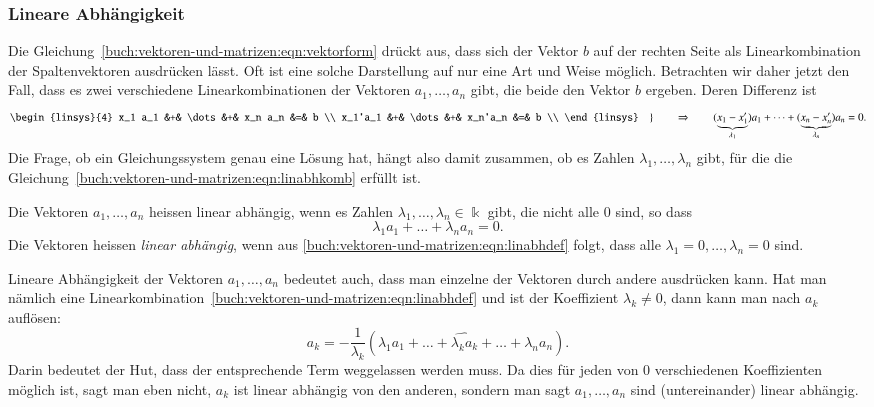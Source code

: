 \subsubsection{Lineare Abhängigkeit}
Die Gleichung~\eqref{buch:vektoren-und-matrizen:eqn:vektorform}
drückt aus, dass sich der Vektor $b$ auf der rechten Seite als
Linearkombination der Spaltenvektoren ausdrücken lässt.
Oft ist eine solche Darstellung auf nur eine Art und Weise möglich.
Betrachten wir daher jetzt den Fall, dass es zwei verschiedene
Linearkombinationen der Vektoren $a_1,\dots,a_n$ gibt, die beide den
Vektor $b$ ergeben.
Deren Differenz ist
\begin{equation}
\left.
\begin{linsys}{4}
x_1 a_1 &+& \dots &+& x_n a_n &=& b \\
x_1'a_1 &+& \dots &+& x_n'a_n &=& b \\
\end{linsys}
\quad\right\}
\qquad
\Rightarrow
\qquad
(\underbrace{x_1-x_1'}_{\lambda_1}) a_1
+
\dots
+
(\underbrace{x_n-x_n'}_{\lambda_n}) a_n
=
0.
\label{buch:vektoren-und-matrizen:eqn:linabhkomb}
\end{equation}
Die Frage, ob ein Gleichungssystem genau eine Lösung hat, hängt also
damit zusammen, ob es Zahlen $\lambda_1,\dots,\lambda_n$ gibt, für
die die Gleichung~\eqref{buch:vektoren-und-matrizen:eqn:linabhkomb}
erfüllt ist.

\begin{definition}
Die Vektoren $a_1,\dots,a_n$ heissen linear abhängig, wenn es Zahlen
$\lambda_1,\dots,\lambda_n\in\Bbbk$ gibt, die nicht alle $0$ sind, so dass
\begin{equation}
\lambda_1a_1+\dots+\lambda_na_n = 0.
\label{buch:vektoren-und-matrizen:eqn:linabhdef}
\end{equation}
Die Vektoren heissen {\em linear abhängig}, wenn aus
\eqref{buch:vektoren-und-matrizen:eqn:linabhdef}
folgt, dass alle $\lambda_1=0,\dots,\lambda_n=0$ sind.
\end{definition}

Lineare Abhängigkeit der Vektoren $a_1,\dots,a_n$ bedeutet auch, dass
man einzelne der Vektoren durch andere ausdrücken kann.
Hat man nämlich eine
Linearkombination~\eqref{buch:vektoren-und-matrizen:eqn:linabhdef} und
ist der Koeffizient $\lambda_k\ne 0$, dann kann man nach $a_k$ auflösen:
\[
a_k = -\frac{1}{\lambda_k}(\lambda_1a_1+\dots+\widehat{\lambda_ka_k}+\dots+\lambda_na_n).
\]
Darin bedeutet der Hut, dass der entsprechende Term weggelassen werden
muss.
Da dies für jeden von $0$ verschiedenen Koeffizienten möglich ist,
sagt man eben nicht, $a_k$ ist linear abhängig von den anderen, sondern
man sagt $a_1,\dots,a_n$ sind (untereinander) linear abhängig.


